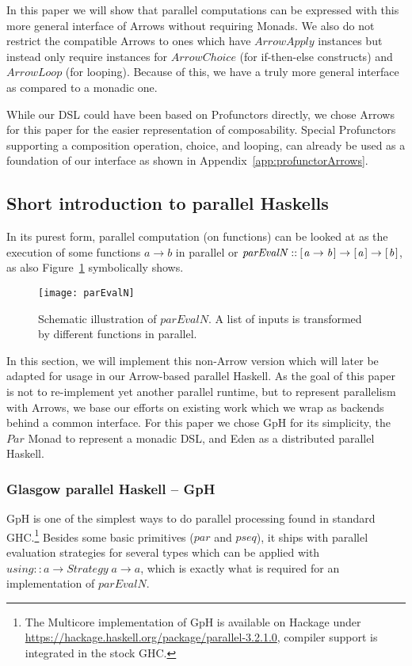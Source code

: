 \documentclass{jfp1}
\newcommand{\Conid}[1]{\mathit{#1}}
\newcommand{\Varid}[1]{\mathit{#1}}
\renewcommand{\cite}[1]{\citep{#1}}
\begin{document}
In this paper we will show that parallel computations can be expressed with this more general interface of Arrows without requiring Monads. We also do not restrict the compatible Arrows to ones which have \ensuremath{\Conid{ArrowApply}} instances but instead only require instances for \ensuremath{\Conid{ArrowChoice}} (for if-then-else constructs) and \ensuremath{\Conid{ArrowLoop}} (for looping). Because of this, we have a truly more general interface as compared to a monadic one.

While our DSL could have been based on Profunctors \citep[see, e.g.][]{boisseau_what_2018} directly, we chose Arrows for this paper for the easier representation of composability. Special Profunctors supporting a composition operation, choice, and looping, can already be used as a foundation of our interface as shown in Appendix~\ref{app:profunctorArrows}.
	\subsection{Short introduction to parallel Haskells}
\label{sec:parallelHaskells}
\label{sec:parEvalNIntro}
In its purest form, parallel computation (on functions) can be looked at as the execution of some functions \ensuremath{\Varid{a}\to \Varid{b}} in parallel or \ensuremath{\Varid{parEvalN}\mathbin{::}[\mskip1.5mu \Varid{a}\to \Varid{b}\mskip1.5mu]\to [\mskip1.5mu \Varid{a}\mskip1.5mu]\to [\mskip1.5mu \Varid{b}\mskip1.5mu]}, as also Figure~\ref{fig:parEvalN} symbolically shows.
\begin{figure}[t]
  \centering
	\texttt{[image: parEvalN]}
	\caption{Schematic illustration of \ensuremath{\Varid{parEvalN}}. A list of inputs is transformed by different functions in parallel.}
	\label{fig:parEvalN}
\end{figure}

In this section, we will implement this non-Arrow version which will later be adapted for usage in our Arrow-based parallel Haskell.
As the goal of this paper is not to re-implement yet another parallel runtime, but to represent parallelism with Arrows, we base our efforts on existing work which we wrap as backends behind a common interface. For this paper we chose GpH for its simplicity, the \ensuremath{\Conid{Par}} Monad to represent a monadic DSL, and Eden as a distributed parallel Haskell.


\subsubsection{Glasgow parallel Haskell -- GpH}
\label{sec:GpHIntro}
GpH \cite{Marlow2009,Trinder1998a} is one of the simplest ways to do parallel processing found in standard GHC.\footnote{The Multicore implementation of GpH is available on Hackage under \url{https://hackage.haskell.org/package/parallel-3.2.1.0}, compiler support is integrated in the stock GHC.} Besides some basic primitives (\ensuremath{\Varid{par}} and \ensuremath{\Varid{pseq}}), it ships with parallel evaluation strategies for several types which can be applied with \ensuremath{\Varid{using}\mathbin{::}\Varid{a}\to \Conid{Strategy}\;\Varid{a}\to \Varid{a}}, which is exactly what is required for an implementation of \ensuremath{\Varid{parEvalN}}.
\end{document}
